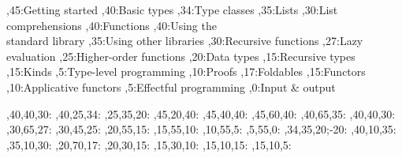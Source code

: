 
\setcounter{diagheight}{50}
\begin{chart}
	,45:{Getting started}
	,40:{Basic types}
	,34:{Type classes}
	,35:{Lists}
	,30:{List\\comprehensions}
	,40:{Functions}
	,40:{Using the\\standard library}
	,35:{Using other libraries}
	,30:{Recursive functions}
	,27:{Lazy evaluation}
	,25:{Higher-order functions}
	,20:{Data types}
	,15:{Recursive types}
	,15:{Kinds}
	,5:{Type-level programming}
	,10:{Proofs}
	,17:{Foldables}
	,15:{Functors}
	,10:{Applicative functors}
	,5:{Effectful programming}
	,0:{Input \& output}
	
	,40,40,30:
	,40,25,34:
	,25,35,20:
	,45,20,40:
	,45,40,40:
	,45,60,40:
	,40,65,35:
	,40,40,30:
	,30,65,27:
	,30,45,25:
	,20,55,15:
	,15,55,10:
	,10,55,5:
	,5,55,0:
	,34,35,20;-20:
	,40,10,35:
	,35,10,30:
	,20,70,17:
	,20,30,15:
	,15,30,10:
	,15,10,15:
	,15,10,5:
\end{chart}

